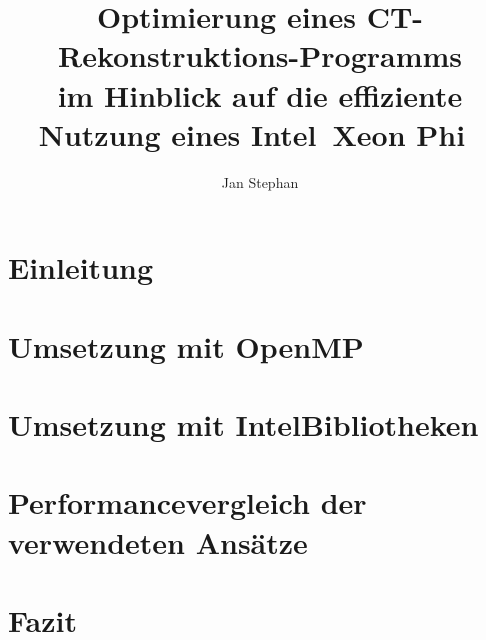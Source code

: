\documentclass[utf8,plainreport,german]{zihpub}
\author{Jan Stephan}
\title{Optimierung eines CT-Rekonstruktions-Programms\\ im Hinblick auf die effiziente Nutzung eines Intel\textregistered\ Xeon Phi\texttrademark\ }
\begin{document}
\chapter{Einleitung}

\chapter{Umsetzung mit OpenMP}
\chapter{Umsetzung mit Intel\textregistered\-Bibliotheken}
\chapter{Performancevergleich der verwendeten Ansätze}
\chapter{Fazit}
\end{document}
